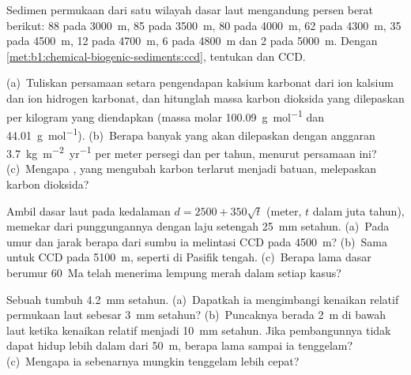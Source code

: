 \begin{exercise}[$\star$]\label{exo:b1:chemical-biogenic-sediments:4}
Sedimen permukaan dari satu wilayah dasar laut mengandung persen berat  berikut: 88 pada \qty{3000}{m}, 85 pada \qty{3500}{m}, 80 pada
\qty{4000}{m}, 62 pada \qty{4300}{m}, 35 pada \qty{4500}{m}, 12 pada \qty{4700}{m}, 6
pada \qty{4800}{m} dan 2 pada \qty{5000}{m}. Dengan
\cref{met:b1:chemical-biogenic-sediments:ccd}, tentukan  dan CCD.
\end{exercise}

\begin{exercise}[$\star\star$]\label{exo:b1:chemical-biogenic-sediments:5}
(a)~Tuliskan persamaan setara pengendapan kalsium karbonat dari ion kalsium dan ion hidrogen karbonat, dan hitunglah massa karbon dioksida yang dilepaskan per kilogram  yang diendapkan (massa molar \qty{100.09}{g.mol^{-1}} dan \qty{44.01}{g.mol^{-1}}). (b)~Berapa banyak yang akan dilepaskan  dengan anggaran \qty{3.7}{kg.m^{-2}.yr^{-1}} per meter persegi dan per tahun, menurut persamaan ini? (c)~Mengapa , yang mengubah karbon terlarut menjadi batuan, melepaskan karbon dioksida?
\end{exercise}

\begin{exercise}[$\star\star$]\label{exo:b1:chemical-biogenic-sediments:6}
Ambil dasar laut pada kedalaman $d = 2500 + 350\sqrt t$ (meter, $t$ dalam juta tahun), memekar dari punggungannya dengan laju setengah \qty{25}{mm} setahun. (a)~Pada umur dan jarak berapa dari sumbu ia melintasi CCD pada \qty{4500}{m}? (b)~Sama untuk CCD pada \qty{5100}{m}, seperti di Pasifik tengah. (c)~Berapa lama dasar berumur \qty{60}{Ma} telah menerima lempung merah dalam setiap kasus?
\end{exercise}

\begin{exercise}[$\star\star$]\label{exo:b1:chemical-biogenic-sediments:7}
Sebuah  tumbuh \qty{4.2}{mm} setahun. (a)~Dapatkah ia mengimbangi kenaikan relatif permukaan laut sebesar \qty{3}{mm} setahun? (b)~Puncaknya berada \qty{2}{m} di bawah laut ketika kenaikan relatif menjadi \qty{10}{mm} setahun. Jika pembangunnya tidak dapat hidup lebih dalam dari \qty{50}{m}, berapa lama sampai ia tenggelam? (c)~Mengapa ia sebenarnya mungkin tenggelam lebih cepat?
\end{exercise}


